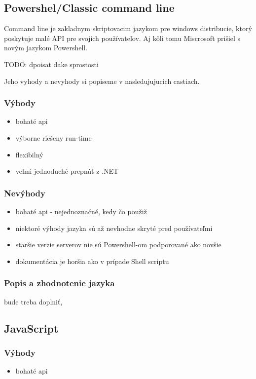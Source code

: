 \subsection{Powershel/Classic command line}
\indent
Command line je zakladnym skriptovacim jazykom pre windows distribucie, ktorý poskytuje malé API  pre svojich používateľov. Aj kôli tomu Miscrosoft prišiel s novým jazykom Powershell.

TODO: dpoisat dake sprostosti

Jeho vyhody a nevyhody si popiseme v nasledujujucich castiach.

\subsubsection{Výhody}
\begin{itemize}
	\item bohaté api
	\item výborne riešeny run-time 
	\item flexibilný
	\item veľmi jednoduché prepnúť z .NET
	\newline
\end{itemize}
\subsubsection{Nevýhody}
\begin{itemize}
	\item bohaté api - nejednoznačné, kedy čo použiž
	\item niektoré výhody jazyka sú až nevhodne skryté pred používateľmi
	\item staršie verzie serverov nie sú Powershell-om podporované ako novšie
	\item dokumentácia je horšia ako v prípade Shell scriptu
	\newline
\end{itemize}

\subsubsection{Popis a zhodnotenie jazyka}
bude treba doplniť,

\subsection{JavaScript}
\subsubsection{Výhody}
\begin{itemize}
	\item bohaté api
	\newline
\end{itemize}
